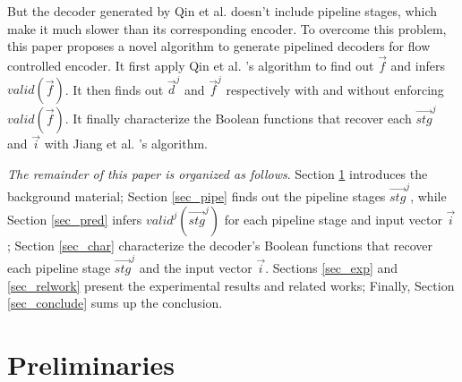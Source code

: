\documentclass[runningheads,a4paper,orivec]{llncs}
\begin{document}
But the decoder generated by Qin et al. \cite{QinTODAES15} doesn't include pipeline stages,
which make it much slower than its corresponding encoder.
To overcome this problem,
this paper proposes a novel algorithm to generate pipelined decoders for flow controlled encoder.
It first apply Qin et al. \cite{QinTODAES15}'s algorithm to find out $\vec{f}$ and infers $valid(\vec{f})$.
It then finds out $\vec{d}^j$ and $\vec{f}^j$ respectively with and without enforcing $valid(\vec{f})$.
It finally characterize the Boolean functions that recover each $\vec{stg}^j$ and $\vec{i}$ with 
Jiang et al. \cite{InterpBoolFunction}'s algorithm.

\emph{The remainder of this paper is organized as follows}.
Section \ref{sec_prem} introduces the background material;
Section \ref{sec_pipe} finds out the pipeline stages $\vec{stg}^j$,
while Section \ref{sec_pred} infers  $valid^j(\vec{stg}^j)$ for each pipeline stage and input vector $\vec{i}$;
Section \ref{sec_char} characterize the decoder's Boolean functions that recover each pipeline stage $\vec{stg}^j$ and the input vector $\vec{i}$.
Sections \ref{sec_exp} and \ref{sec_relwork} present the experimental results and related works;
Finally,
Section \ref{sec_conclude} sums up the conclusion.

\section{Preliminaries}\label{sec_prem}

\end{document}

